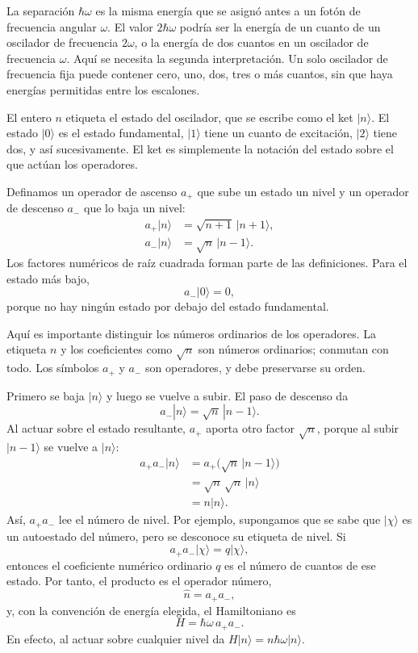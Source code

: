 La separación \(\hbar\omega\) es la misma energía que se asignó antes a un fotón de frecuencia angular \(\omega\). El valor \(2\hbar\omega\) podría ser la energía de un cuanto de un oscilador de frecuencia \(2\omega\), o la energía de dos cuantos en un oscilador de frecuencia \(\omega\). Aquí se necesita la segunda interpretación. Un solo oscilador de frecuencia fija puede contener cero, uno, dos, tres o más cuantos, sin que haya energías permitidas entre los escalones.

El entero \(n\) etiqueta el estado del oscilador, que se escribe como el ket \(|n\rangle\). El estado \(|0\rangle\) es el estado fundamental, \(|1\rangle\) tiene un cuanto de excitación, \(|2\rangle\) tiene dos, y así sucesivamente. El ket es simplemente la notación del estado sobre el que actúan los operadores.

Definamos un operador de ascenso \(a_+\) que sube un estado un nivel y un operador de descenso \(a_-\) que lo baja un nivel:
\begin{align}
a_+|n\rangle &= \sqrt{n+1}\,|n+1\rangle,\\
a_-|n\rangle &= \sqrt{n}\,|n-1\rangle.
\end{align}
Los factores numéricos de raíz cuadrada forman parte de las definiciones. Para el estado más bajo,
\begin{equation}
a_-|0\rangle=0,
\end{equation}
porque no hay ningún estado por debajo del estado fundamental.

Aquí es importante distinguir los números ordinarios de los operadores. La etiqueta \(n\) y los coeficientes como \(\sqrt n\) son números ordinarios; conmutan con todo. Los símbolos \(a_+\) y \(a_-\) son operadores, y debe preservarse su orden.

Primero se baja \(|n\rangle\) y luego se vuelve a subir. El paso de descenso da
\begin{equation}
a_-|n\rangle=\sqrt n\,|n-1\rangle.
\end{equation}
Al actuar sobre el estado resultante, \(a_+\) aporta otro factor \(\sqrt n\), porque al subir \(|n-1\rangle\) se vuelve a \(|n\rangle\):
\begin{align}
a_+a_-|n\rangle
&=a_+\bigl(\sqrt n\,|n-1\rangle\bigr)\\
&=\sqrt n\,\sqrt n\,|n\rangle\\
&=n|n\rangle.
\end{align}
Así, \(a_+a_-\) lee el número de nivel. Por ejemplo, supongamos que se sabe que \(|\chi\rangle\) es un autoestado del número, pero se desconoce su etiqueta de nivel. Si
\begin{equation}
a_+a_-|\chi\rangle=q|\chi\rangle,
\end{equation}
entonces el coeficiente numérico ordinario \(q\) es el número de cuantos de ese estado. Por tanto, el producto es el operador número,
\begin{equation}
\hat n=a_+a_-,
\end{equation}
y, con la convención de energía elegida, el Hamiltoniano es
\begin{equation}
H=\hbar\omega\,a_+a_-.
\end{equation}
En efecto, al actuar sobre cualquier nivel da \(H|n\rangle=n\hbar\omega|n\rangle\).

